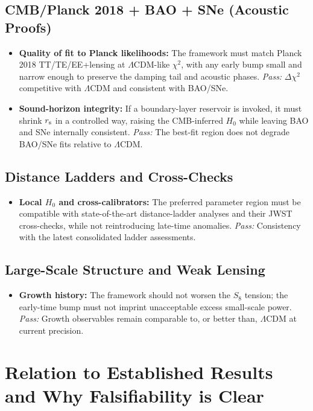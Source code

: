 \documentclass[11pt,a4paper]{article}
\newcommand{\rs}{r_{\rm s}}
\begin{document}
\subsection{CMB/Planck 2018 + BAO + SNe (Acoustic Proofs)}
\begin{itemize}[leftmargin=1.8em]
\item \textbf{Quality of fit to Planck likelihoods:} The framework must match Planck 2018 TT/TE/EE+lensing at $\Lambda$CDM-like $\chi^2$, with any early bump small and narrow enough to preserve the damping tail and acoustic phases. \emph{Pass:} $\Delta\chi^2$ competitive with $\Lambda$CDM and consistent with BAO/SNe. 
\item \textbf{Sound-horizon integrity:} If a boundary-layer reservoir is invoked, it must shrink $\rs$ in a controlled way, raising the CMB-inferred $H_0$ while leaving BAO and SNe internally consistent. \emph{Pass:} The best-fit region does not degrade BAO/SNe fits relative to $\Lambda$CDM. 
\end{itemize}

\subsection{Distance Ladders and Cross-Checks}
\begin{itemize}[leftmargin=1.8em]
\item \textbf{Local $H_0$ and cross-calibrators:} The preferred parameter region must be compatible with state-of-the-art distance-ladder analyses and their JWST cross-checks, while not reintroducing late-time anomalies. \emph{Pass:} Consistency with the latest consolidated ladder assessments.
\end{itemize}

\subsection{Large-Scale Structure and Weak Lensing}
\begin{itemize}[leftmargin=1.8em]
\item \textbf{Growth history:} The framework should not worsen the $S_8$ tension; the early-time bump must not imprint unacceptable excess small-scale power. \emph{Pass:} Growth observables remain comparable to, or better than, $\Lambda$CDM at current precision.
\end{itemize}

\section{Relation to Established Results and Why Falsifiability is Clear}
\end{document}
